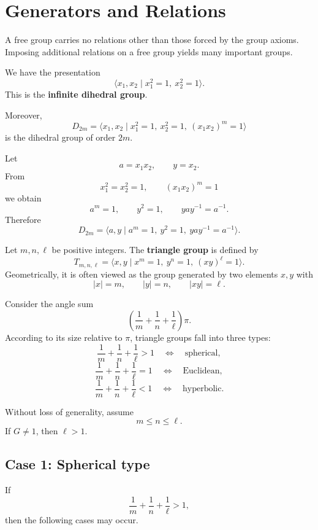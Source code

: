 \section{Generators and Relations}

A free group carries no relations other than those forced by the group axioms. Imposing additional relations on a free group yields many important groups.

\begin{example}
We have the presentation
\[
\langle x_1,x_2\mid x_1^2=1,\ x_2^2=1\rangle.
\]
This is the \textbf{infinite dihedral group}.

Moreover,
\[
D_{2m}
=
\langle x_1,x_2\mid x_1^2=1,\ x_2^2=1,\ (x_1x_2)^m=1\rangle
\]
is the dihedral group of order \(2m\).
\end{example}

\begin{example}
Let
\[
a=x_1x_2,\qquad y=x_2.
\]
From
\[
x_1^2=x_2^2=1,\qquad (x_1x_2)^m=1
\]
we obtain
\[
a^m=1,\qquad y^2=1,\qquad yay^{-1}=a^{-1}.
\]
Therefore
\[
D_{2m}
=
\langle a,y\mid a^m=1,\ y^2=1,\ yay^{-1}=a^{-1}\rangle.
\]
\end{example}

\begin{definition}
Let \(m,n,\ell\) be positive integers. The \textbf{triangle group} is defined by
\[
T_{m,n,\ell}
=
\langle x,y\mid x^m=1,\ y^n=1,\ (xy)^\ell=1\rangle.
\]
Geometrically, it is often viewed as the group generated by two elements \(x,y\) with
\[
|x|=m,\qquad |y|=n,\qquad |xy|=\ell.
\]
\end{definition}

Consider the angle sum
\[
\left(\frac1m+\frac1n+\frac1\ell\right)\pi.
\]
According to its size relative to \(\pi\), triangle groups fall into three types:
\[
\frac1m+\frac1n+\frac1\ell>1
\quad\Longleftrightarrow\quad
\text{spherical},
\]
\[
\frac1m+\frac1n+\frac1\ell=1
\quad\Longleftrightarrow\quad
\text{Euclidean},
\]
\[
\frac1m+\frac1n+\frac1\ell<1
\quad\Longleftrightarrow\quad
\text{hyperbolic}.
\]

Without loss of generality, assume
\[
m\leq n\leq \ell.
\]
If \(G\neq 1\), then \(\ell>1\).

\subsection*{Case 1: Spherical type}

If
\[
\frac1m+\frac1n+\frac1\ell>1,
\]
then the following cases may occur.

